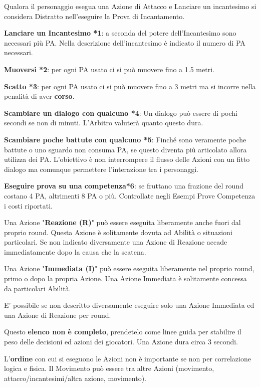 \documentclass[12pt,a4paper,twoside,openany]{book}
\begin{document}
Qualora il personaggio esegua una Azione di Attacco e Lanciare un incantesimo si considera Distratto nell'eseguire la Prova di Incantamento.

\begin{multicols}{2}
	
\textbf{Lanciare un Incantesimo *1}: a seconda del potere dell'Incantesimo sono necessari più PA. Nella descrizione dell'incantesimo è indicato il numero di PA necessari. 

\textbf{Muoversi *2}: per ogni PA usato ci si può muovere fino a 1.5 metri.

\textbf{Scatto *3}: per ogni PA usato ci si può muovere fino a 3 metri ma si incorre nella penalità di aver \textbf{corso}.

\textbf{Scambiare un dialogo con qualcuno *4}: Un dialogo può essere di pochi secondi se non di minuti. L'Arbitro valuterà quanto questo dura.

\textbf{Scambiare poche battute con qualcuno *5}: Finché sono veramente poche battute o uno sguardo non consuma PA, se questo diventa più articolato allora utilizza dei PA. L'obiettivo è non interrompere il flusso delle Azioni con un fitto dialogo ma comunque permettere l'interazione tra i personaggi.

\textbf{Eseguire prova su una competenza*6}: se fruttano una frazione del round costano 4 PA, altrimenti 8 PA o più. Controllate negli Esempi Prove Competenza i costi riportati.

Una Azione "\textbf{Reazione (R)}" può essere eseguita liberamente anche fuori dal proprio round. Questa Azione è solitamente dovuta ad Abilità o situazioni particolari. Se non indicato diversamente una Azione di Reazione accade immediatamente dopo la causa che la scatena.

Una Azione "\textbf{Immediata (I)}" può essere eseguita liberamente nel proprio round, primo o dopo la propria Azione. Una Azione Immediata è solitamente concessa da particolari Abilità.

E' possibile se non descritto diversamente eseguire solo una Azione Immediata ed una Azione di Reazione per round.

\medskip

Questo \textbf{elenco non è completo}, prendetelo come linee guida per stabilire il peso delle decisioni ed azioni dei giocatori. Una Azione dura circa 3 secondi.

L'\textbf{ordine} con cui si eseguono le Azioni non è importante se non per correlazione logica e fisica. Il Movimento può essere tra altre Azioni (movimento, attacco/incantesimi/altra azione, movimento).


\end{multicols}
\end{document}
